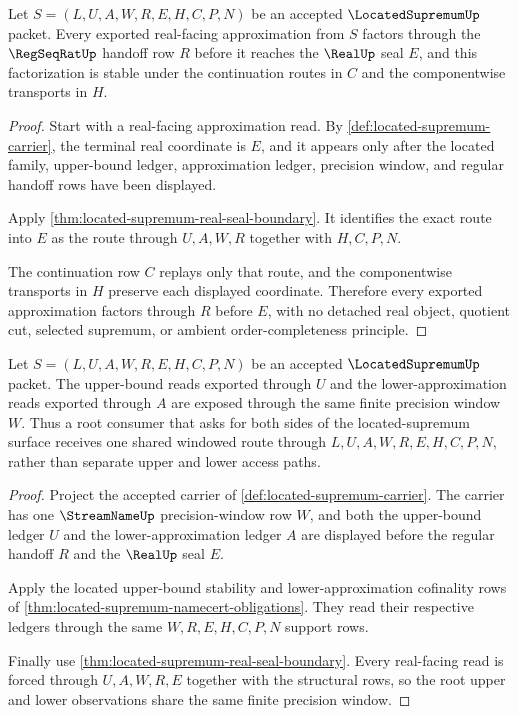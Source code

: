 \begin{theorem}
\label{thm:located-supremum-regseqrat-real-handoff-stability}
Let $S=(L,U,A,W,R,E,H,C,P,N)$ be an accepted $\LocatedSupremumUp$ packet. Every exported real-facing approximation from $S$ factors through the $\RegSeqRatUp$ handoff row $R$ before it reaches the $\RealUp$ seal $E$, and this factorization is stable under the continuation routes in $C$ and the componentwise transports in $H$.
\end{theorem}
\begin{proof}
Start with a real-facing approximation read. By \autoref{def:located-supremum-carrier}, the terminal real coordinate is $E$, and it appears only after the located family, upper-bound ledger, approximation ledger, precision window, and regular handoff rows have been displayed.

Apply \autoref{thm:located-supremum-real-seal-boundary}. It identifies the exact route into $E$ as the route through $U,A,W,R$ together with $H,C,P,N$.

The continuation row $C$ replays only that route, and the componentwise transports in $H$ preserve each displayed coordinate. Therefore every exported approximation factors through $R$ before $E$, with no detached real object, quotient cut, selected supremum, or ambient order-completeness principle.
\end{proof}

\begin{theorem}
\label{thm:locatedsupremum-root-upper-lower-window}
Let $S=(L,U,A,W,R,E,H,C,P,N)$ be an accepted $\LocatedSupremumUp$ packet. The upper-bound reads exported through $U$ and the lower-approximation reads exported through $A$ are exposed through the same finite precision window $W$. Thus a root consumer that asks for both sides of the located-supremum surface receives one shared windowed route through $L,U,A,W,R,E,H,C,P,N$, rather than separate upper and lower access paths.
\end{theorem}
\begin{proof}
Project the accepted carrier of \autoref{def:located-supremum-carrier}. The carrier has one $\StreamNameUp$ precision-window row $W$, and both the upper-bound ledger $U$ and the lower-approximation ledger $A$ are displayed before the regular handoff $R$ and the $\RealUp$ seal $E$.

Apply the located upper-bound stability and lower-approximation cofinality rows of \autoref{thm:located-supremum-namecert-obligations}. They read their respective ledgers through the same $W,R,E,H,C,P,N$ support rows.

Finally use \autoref{thm:located-supremum-real-seal-boundary}. Every real-facing read is forced through $U,A,W,R,E$ together with the structural rows, so the root upper and lower observations share the same finite precision window.
\end{proof}


